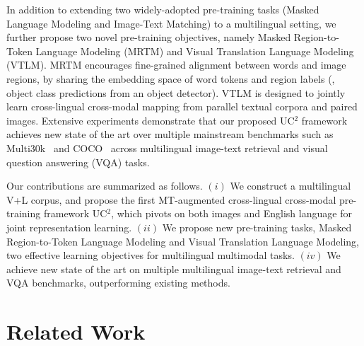 \documentclass[final]{cvpr}
\newcommand{\jj}[1]{\textcolor{red}{\small{\bf [JJ: #1 ]}}}
\newcommand{\mingyang}[1]{\textcolor{brown}{\small{\bf [Mingyang: #1 ]}}}
\begin{document}
In addition to extending two widely-adopted pre-training tasks (Masked Language Modeling and Image-Text Matching) to a multilingual setting, we further propose two novel pre-training objectives, namely Masked Region-to-Token Language Modeling (MRTM) and Visual Translation Language  Modeling (VTLM). MRTM encourages fine-grained alignment between words and image regions, by sharing the embedding space of word tokens and region labels (\ie, object class predictions from an object detector). VTLM is designed to jointly learn cross-lingual cross-modal mapping from parallel textual corpora and paired images. Extensive experiments demonstrate that our proposed UC$^2$ framework achieves new state of the art over multiple mainstream benchmarks such as Multi30k~\cite{multi30k, multi30k_extension_1, multi30k_extension_2} and COCO~\cite{MSCOCO, MSCOCO_JA, MSCOCO_ZH} across multilingual image-text retrieval and visual question answering (VQA) tasks.

Our contributions are summarized as follows. $(i)$ We construct a multilingual V+L corpus, and propose the first MT-augmented cross-lingual cross-modal pre-training framework UC$^2$, which pivots on both images and English language for joint representation learning.
$(ii)$ We propose new pre-training tasks, Masked Region-to-Token Language Modeling and Visual Translation Language Modeling, two effective learning objectives for multilingual multimodal tasks. 
$(iv)$ We achieve new state of the art on multiple multilingual image-text retrieval and VQA benchmarks, outperforming existing methods. %
\section{Related Work}
\end{document}

